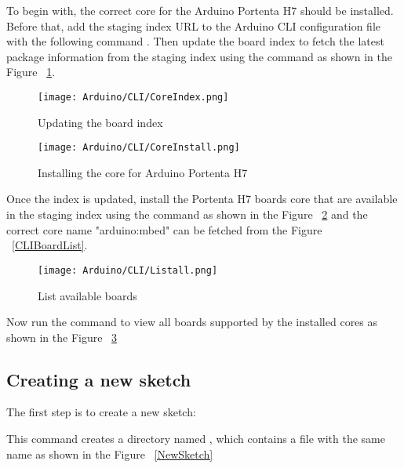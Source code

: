 To begin with, the correct core for the Arduino Portenta H7 should be installed. Before that, add the staging index URL to the Arduino CLI configuration file  with the following command . Then update the board index to fetch the latest package information from the staging index using the command  as shown in the Figure ~\ref{CoreIndex}.
\begin{figure}
	\begin{center}
		\texttt{[image: Arduino/CLI/CoreIndex.png]}
		\caption{Updating the board index}
		\label{CoreIndex}
	\end{center}
\end{figure}
\begin{figure}
	\begin{center}
		\texttt{[image: Arduino/CLI/CoreInstall.png]}
		\caption{Installing the core for Arduino Portenta H7}
		\label{CoreInstall}
	\end{center}
\end{figure}

Once the index is updated, install the Portenta H7 boards core that are available in the staging index using the command  as shown in the Figure ~\ref{CoreInstall} and the correct core name "arduino:mbed" can be fetched from the Figure ~\ref{CLIBoardList}.
\begin{figure}
	\begin{center}
		\texttt{[image: Arduino/CLI/Listall.png]}
		\caption{List available boards}
		\label{Listall}
	\end{center}
\end{figure}

Now run the command  to view all boards supported by the installed cores as shown in the Figure ~\ref{Listall}

\subsection{Creating a new sketch}
The first step is to create a new sketch:


This command creates a directory named , which contains a file with the same name as shown in the Figure ~\ref{NewSketch}

